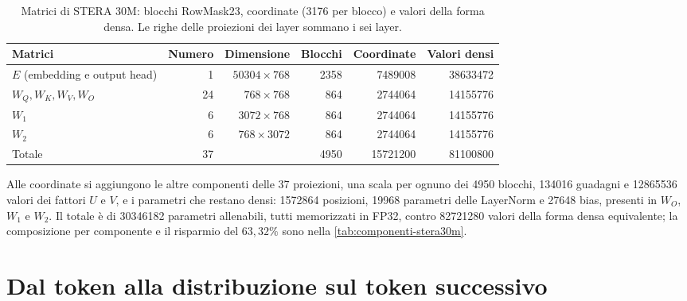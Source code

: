 \begin{table}[H]
\centering
\small
\begin{tabular}{lrrrrr}
\toprule
Matrici & Numero & Dimensione & Blocchi & Coordinate & Valori densi \\
\midrule
$E$ (embedding e output head) & 1 & $\num{50304}\times768$ & \num{2358} & \num{7489008} & \num{38633472} \\
$W_Q,W_K,W_V,W_O$ & 24 & $768\times768$ & \num{864} & \num{2744064} & \num{14155776} \\
$W_1$ & 6 & $\num{3072}\times768$ & \num{864} & \num{2744064} & \num{14155776} \\
$W_2$ & 6 & $768\times\num{3072}$ & \num{864} & \num{2744064} & \num{14155776} \\
\midrule
Totale & 37 & & \num{4950} & \num{15721200} & \num{81100800} \\
\bottomrule
\end{tabular}
\caption{Matrici di STERA 30M: blocchi RowMask23, coordinate (\num{3176} per blocco) e valori della forma densa. Le righe delle proiezioni dei layer sommano i sei layer.}
\label{tab:atlante-matrici}
\end{table}

Alle coordinate si aggiungono le altre componenti delle 37 proiezioni, una scala per ognuno dei \num{4950} blocchi, \num{134016} guadagni e \num{12865536} valori dei fattori $U$ e $V$, e i parametri che restano densi: \num{1572864} posizioni, \num{19968} parametri delle LayerNorm e \num{27648} bias, presenti in $W_O$, $W_1$ e $W_2$. Il totale è di \num{30346182} parametri allenabili, tutti memorizzati in FP32, contro \num{82721280} valori della forma densa equivalente; la composizione per componente e il risparmio del $63{,}32\%$ sono nella \autoref{tab:componenti-stera30m}.

\section{Dal token alla distribuzione sul token successivo}
\label{sec:percorso-token}

